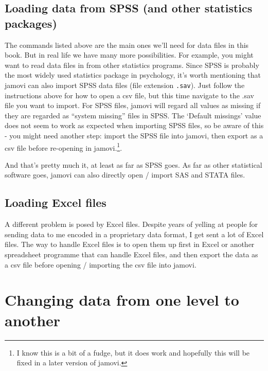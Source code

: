 \documentclass[
]{book}
\begin{document}
\hypertarget{loading-data-from-spss-and-other-statistics-packages}{%
\subsection{Loading data from SPSS (and other statistics packages)}\label{loading-data-from-spss-and-other-statistics-packages}}

The commands listed above are the main ones we'll need for data files in this book. But in real life we have many more possibilities. For example, you might want to read data files in from other statistics programs. Since SPSS is probably the most widely used statistics package in psychology, it's worth mentioning that jamovi can also import SPSS data files (file extension \texttt{.sav}). Just follow the instructions above for how to open a csv file, but this time navigate to the .sav file you want to import. For SPSS files, jamovi will regard all values as missing if they are regarded as ``system missing'' files in SPSS. The `Default missings' value does not seem to work as expected when importing SPSS files, so be aware of this - you might need another step: import the SPSS file into jamovi, then export as a csv file before re-opening in jamovi.\footnote{I know this is a bit of a fudge, but it does work and hopefully this will be fixed in a later version of jamovi.}.

And that's pretty much it, at least as far as SPSS goes. As far as other statistical software goes, jamovi can also directly open / import SAS and STATA files.

\hypertarget{loading-excel-files}{%
\subsection{Loading Excel files}\label{loading-excel-files}}

A different problem is posed by Excel files. Despite years of yelling at people for sending data to me encoded in a proprietary data format, I get sent a lot of Excel files. The way to handle Excel files is to open them up first in Excel or another spreadsheet programme that can handle Excel files, and then export the data as a csv file before opening / importing the csv file into jamovi.

\hypertarget{coercion}{%
\section{Changing data from one level to another}\label{coercion}}
\end{document}
